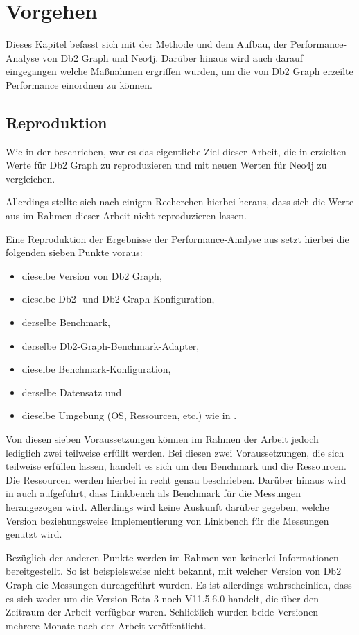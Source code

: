 \chapter{Vorgehen}
\label{vorgehen}
Dieses Kapitel befasst sich mit der Methode und dem Aufbau, der Performance-Analyse von Db2 Graph und Neo4j. Darüber hinaus wird auch darauf eingegangen welche Maßnahmen ergriffen wurden, um die von Db2 Graph erzeilte Performance einordnen zu können. 

\section{Reproduktion}
Wie in der  beschrieben, war es das eigentliche Ziel dieser Arbeit, die in \cite{sigmod_tian} erzielten Werte für Db2 Graph zu reproduzieren und mit neuen Werten für Neo4j zu vergleichen. 

Allerdings stellte sich nach einigen Recherchen hierbei heraus, dass sich die Werte aus \cite{sigmod_tian} im Rahmen dieser Arbeit nicht reproduzieren lassen. 

Eine Reproduktion der Ergebnisse der Performance-Analyse aus \cite{sigmod_tian} setzt hierbei die folgenden sieben Punkte voraus:
\begin{itemize}
    \item dieselbe Version von Db2 Graph,
    \item dieselbe Db2- und Db2-Graph-Konfiguration,
    \item derselbe Benchmark,
    \item derselbe Db2-Graph-Benchmark-Adapter,
    \item dieselbe Benchmark-Konfiguration,
    \item derselbe Datensatz und 
    \item dieselbe Umgebung (OS, Ressourcen, etc.) wie in \cite{sigmod_tian}.
\end{itemize}
Von diesen sieben Voraussetzungen können im Rahmen der Arbeit jedoch lediglich zwei teilweise erfüllt werden. Bei diesen zwei Voraussetzungen, die sich teilweise erfüllen lassen, handelt es sich um den Benchmark und die Ressourcen. Die Ressourcen werden hierbei in \cite{sigmod_tian} recht genau beschrieben. Darüber hinaus wird in \cite{sigmod_tian} auch aufgeführt, dass Linkbench als Benchmark für die Messungen herangezogen wird. Allerdings wird keine Auskunft darüber gegeben, welche Version beziehungsweise Implementierung von Linkbench für die Messungen genutzt wird.

Bezüglich der anderen Punkte werden im Rahmen von \cite{sigmod_tian} keinerlei Informationen bereitgestellt. So ist beispielsweise nicht bekannt, mit welcher Version von Db2 Graph die Messungen durchgeführt wurden. Es ist allerdings wahrscheinlich, dass es sich weder um die Version Beta 3 noch V11.5.6.0 handelt, die über den Zeitraum der Arbeit verfügbar waren. Schließlich wurden beide Versionen mehrere Monate nach der Arbeit veröffentlicht. 

